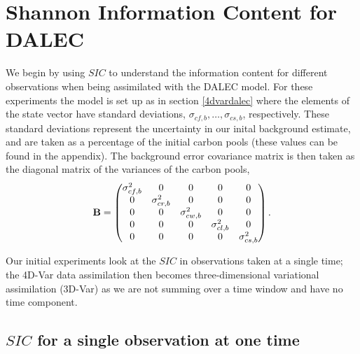 \documentclass[11pt]{article}
\begin{document}
\section{Shannon Information Content for DALEC}%

We begin by using $SIC$ to understand the information content for different observations when being assimilated with the DALEC model. For these experiments the model is set up as in section \ref{4dvardalec} where the elements of the state vector have standard deviations, $\sigma_{cf,b},\ldots,\sigma_{cs,b}$, respectively. These standard deviations represent the uncertainty in our inital background estimate, and are taken as a percentage of the initial carbon pools (these values can be found in the appendix). The background error covariance matrix is then taken as the diagonal matrix of the variances of the carbon pools,
\begin{equation}
\bf{B} = \begin{pmatrix} 
\sigma_{cf,b}^{2} & 0 & 0 & 0 & 0 \\
0 & \sigma_{cr,b}^{2} & 0 & 0 & 0 \\
0 & 0 & \sigma_{cw,b}^{2} & 0 & 0 \\
0 & 0 & 0 & \sigma_{cl,b}^{2} & 0 \\
0 & 0 & 0 & 0 & \sigma_{cs,b}^{2} \\
\end{pmatrix}. \label{Bmat}
\end{equation}

Our initial experiments look at the $SIC$ in observations taken at a single time; the 4D-Var data assimilation then becomes three-dimensional variational assimilation (3D-Var) as we are not summing over a time window and have no time component.

\subsection{$SIC$ for a single observation at one time} \label{sic1time}%
\end{document}
